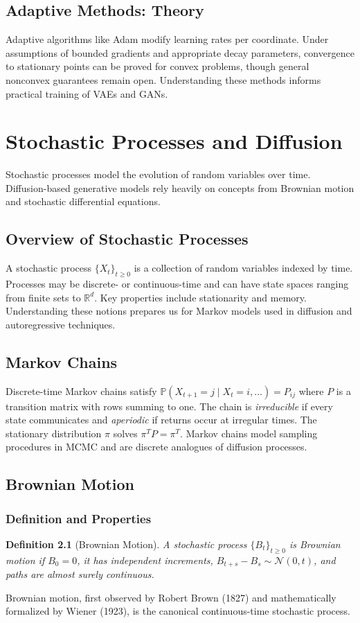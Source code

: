 \documentclass[11pt]{book}
\newtheorem{definition}{Definition}[chapter]
\begin{document}
\section{Adaptive Methods: Theory}
Adaptive algorithms like Adam modify learning rates per coordinate. Under assumptions of bounded gradients and appropriate decay parameters, convergence to stationary points can be proved for convex problems, though general nonconvex guarantees remain open. Understanding these methods informs practical training of VAEs and GANs.

\chapter{Stochastic Processes and Diffusion}
Stochastic processes model the evolution of random variables over time. Diffusion-based generative models rely heavily on concepts from Brownian motion and stochastic differential equations.

\section{Overview of Stochastic Processes}
A stochastic process $\{X_t\}_{t\ge0}$ is a collection of random variables indexed by time. Processes may be discrete- or continuous-time and can have state spaces ranging from finite sets to $\mathbb{R}^d$. Key properties include stationarity and memory. Understanding these notions prepares us for Markov models used in diffusion and autoregressive techniques.

\section{Markov Chains}
Discrete-time Markov chains satisfy $\mathbb{P}(X_{t+1}=j\mid X_t=i,\ldots)=P_{ij}$ where $P$ is a transition matrix with rows summing to one. The chain is \emph{irreducible} if every state communicates and \emph{aperiodic} if returns occur at irregular times. The stationary distribution $\pi$ solves $\pi^T P=\pi^T$. Markov chains model sampling procedures in MCMC and are discrete analogues of diffusion processes.

\section{Brownian Motion}
\subsection{Definition and Properties}
\begin{definition}[Brownian Motion]
A stochastic process $\{B_t\}_{t\ge0}$ is Brownian motion if $B_0=0$, it has independent increments, $B_{t+s}-B_s\sim\mathcal{N}(0,t)$, and paths are almost surely continuous.
\end{definition}
Brownian motion, first observed by Robert Brown (1827) and mathematically formalized by Wiener (1923), is the canonical continuous-time stochastic process.
\end{document}

